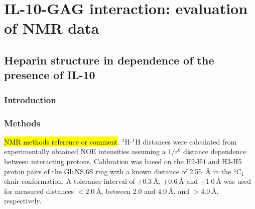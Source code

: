 \chapter{IL-10-GAG interaction: evaluation of NMR data}
\section{Heparin structure in dependence of the presence of IL-10}
\subsection{Introduction}
\subsection{Methods}

\hl{NMR methods reference or comment}. ${}^1$H-${}^1$H distances were calculated
from experimentally obtained NOE intensities assuming a $1/r^6$ distance
dependence between interacting protons. Calibration was based on the H2-H4 and
H3-H5 proton pairs of the GlcNS,6S ring with a known distance of
\SI{2.55}{\angstrom} in the ${}^4$C${}_1$ chair conformation. A tolerance
interval of $\pm \SI{0.3}{\angstrom}$, $\pm \SI{0.6}{\angstrom}$ and $\pm
\SI{1.0}{\angstrom}$ was used for measured distances $< \SI{2.0}{\angstrom}$,
between \num{2.0} and $\SI{4.0}{\angstrom}$, and $> \SI{4.0}{\angstrom}$,
respectively.


